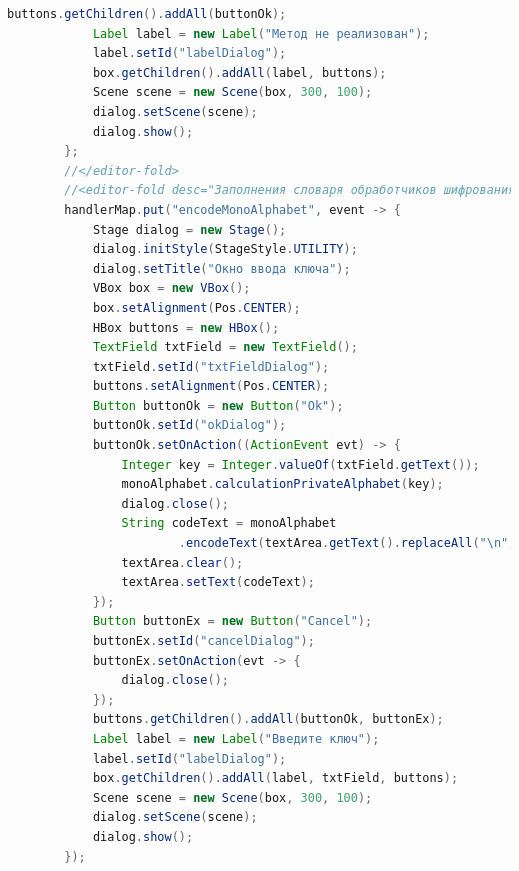 \documentclass[a4paper,12pt]{article}
\begin{document}
\begin{lstlisting}[language=java, caption=код модуля MainWindowController.java]
            buttons.getChildren().addAll(buttonOk);
            Label label = new Label("Метод не реализован");
            label.setId("labelDialog");
            box.getChildren().addAll(label, buttons);
            Scene scene = new Scene(box, 300, 100);
            dialog.setScene(scene);
            dialog.show();
        };
        //</editor-fold>
        //<editor-fold desc="Заполнения словаря обработчиков шифрования/расшифрования для реализованых методов"  defaultstate="collapsed">
        handlerMap.put("encodeMonoAlphabet", event -> {
            Stage dialog = new Stage();
            dialog.initStyle(StageStyle.UTILITY);
            dialog.setTitle("Окно ввода ключа");
            VBox box = new VBox();
            box.setAlignment(Pos.CENTER);
            HBox buttons = new HBox();
            TextField txtField = new TextField();
            txtField.setId("txtFieldDialog");
            buttons.setAlignment(Pos.CENTER);
            Button buttonOk = new Button("Ok");
            buttonOk.setId("okDialog");
            buttonOk.setOnAction((ActionEvent evt) -> {
                Integer key = Integer.valueOf(txtField.getText());
                monoAlphabet.calculationPrivateAlphabet(key);
                dialog.close();
                String codeText = monoAlphabet
                        .encodeText(textArea.getText().replaceAll("\n", " "));
                textArea.clear();
                textArea.setText(codeText);
            });
            Button buttonEx = new Button("Cancel");
            buttonEx.setId("cancelDialog");
            buttonEx.setOnAction(evt -> {
                dialog.close();
            });
            buttons.getChildren().addAll(buttonOk, buttonEx);
            Label label = new Label("Введите ключ");
            label.setId("labelDialog");
            box.getChildren().addAll(label, txtField, buttons);
            Scene scene = new Scene(box, 300, 100);
            dialog.setScene(scene);
            dialog.show();
        });


\end{lstlisting}
\end{document}
